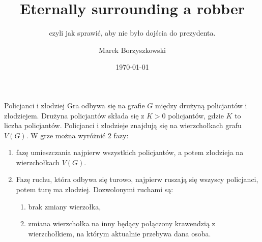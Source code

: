 \documentclass[polish]{beamer}
\title[Eternally surrounding a robber]{Eternally surrounding a robber}
\subtitle{czyli jak sprawić, aby nie było dojścia do prezydenta.}
\author{Marek Borzyszkowski}
\date{\today}
\begin{document}

\pgtitleframe



\begin{frame}{Policjanci i złodziej}
Gra odbywa się na grafie $G$ między drużyną policjantów i złodziejem. 
Drużyna policjantów składa się z $K>0$ policjantów, gdzie $K$ to liczba policjantów.
Policjanci i złodzieje znajdują się na wierzchołkach grafu $V\left(G\right)$. \pause
W grze można wyróżnić 2 fazy:
    \begin{enumerate}
        \item fazę umieszczania najpierw wszystkich policjantów, a potem złodzieja na wierzchołkach $V\left(G\right)$.
        \item Fazę ruchu, która odbywa się turowo, najpierw ruszają się wszyscy policjanci, potem turę ma złodziej. 
        Dozwolonymi ruchami są:
        \begin{enumerate}
            \item brak zmiany wierzołka,
            \item zmiana wierzchołka na inny będący połączony krawendzią z wierzchołkiem, 
            na którym aktualnie przebywa dana osoba.
        \end{enumerate} 
    \end{enumerate}
\end{frame}
\end{document}
